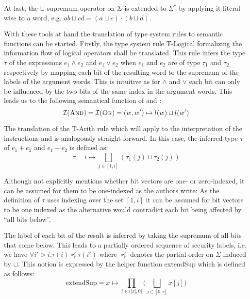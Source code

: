 At last, the $ \sqcup $-supremum operator on $ \Sigma $ is extended to $ \Sigma^* $ by applying it literal-wise to a word, e.g. $ ab \sqcup cd = (a \sqcup c) \cdot (b \sqcup d) $.

With these tools at hand the translation of type system rules to semantic functions can be started.
Firstly, the type system rule T-Logical formalizing the information flow of logical operators shall be translated.
This rule infers the type $ \tau $ of the expressions $ e_1 \land e_2 $ and $ e_1 \lor e_2 $ when $ e_1 $ and $ e_2 $ are of type $ \tau_1 $ and $ \tau_2 $ respectively by mapping each bit of the resulting word to the supremum of the labels of the argument words.
This is intuitive as for $ \land $ and $ \lor $ each bit can only be influenced by the two bits of the same index in the argument words.
This leads us to the following semantical function of  and :
\begin{equation*}
    \mathcal{I}(\textsc{And}) = \mathcal{I}(\textsc{Or}) = (w, w') \mapsto l(w) \sqcup l(w')
\end{equation*}

The translation of the T-Arith rule which will apply to the interpretation of the instructions  and  is analogously straight-forward.
In this case, the inferred type $ \tau $ of $ e_1 + e_2 $ and $ e_1 - e_2 $ is defined as:
\begin{equation*}
    \tau = i \mapsto \bigsqcup_{j \in [1, i]} (\tau_1(j) \sqcup \tau_2(j))
\end{equation*}

Although \cite{Ferraiuolo17} not explicitly mentions whether bit vectors are one- or zero-indexed, it can be assumed for them to be one-indexed as the authors write: 
As the definition of $ \tau $ uses indexing over the set $ [ 1, i ] $ it can be assumed for bit vectors to be one indexed as the alternative would contradict each bit being affected by \enquote{all bits below}.

The label of each bit of the result is inferred by taking the supremum of all bits that come below.
This leads to a partially ordered sequence of security labels, i.e. we have $ \forall i' > i. \tau(i) \preceq \tau(i') $ where $ \preceq $ denotes the partial order on $ \Sigma $ induced by $ \sqcup $.
This notion is expressed by the helper function extendSup which is defined as follows:
\begin{equation*}
    \text{extendSup} = x \mapsto \prod_{i \in (|x|, 0]} \Big( \bigsqcup_{j \in [0, i]} x[j] \Big)
\end{equation*}


